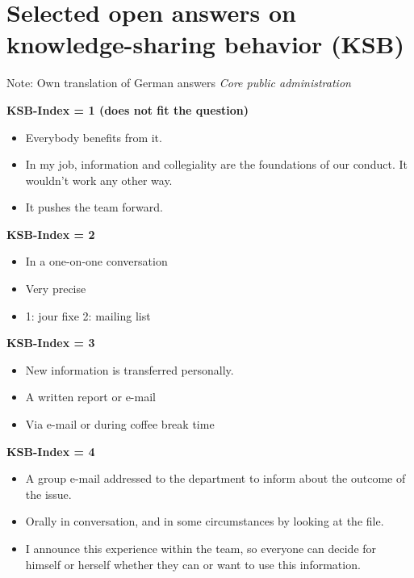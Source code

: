 \documentclass[twocolumn, serif, empirical, authordate]{jote-article}
\begin{document}
\section*{Selected open answers on knowledge-sharing behavior (KSB)}

Note: Own translation of German answers \emph{Core public administration} 

\textbf{KSB-Index = 1 (does not fit the question)}

\begin{itemize} \item Everybody benefits from it.
\item In my job, information and collegiality are the foundations of our conduct. It wouldn't work any other way.
\item It pushes the team forward.
\end{itemize} 

\textbf{KSB-Index = 2}

\begin{itemize} \item In a one-on-one conversation \item Very precise \item 1: jour fixe 2: mailing list \end{itemize} 

\textbf{KSB-Index = 3}

\begin{itemize} \item New information is transferred personally.
\item A written report or e-mail \item Via e-mail or during coffee break time \end{itemize} 

\textbf{KSB-Index = 4}

\begin{itemize} \item A group e-mail addressed to the department to inform about the outcome of the issue.
\item Orally in conversation, and in some circumstances by looking at the file.
\item I announce this experience within the team, so everyone can decide for himself or herself whether they can or want to use this information.
\end{itemize} 
\end{document}
